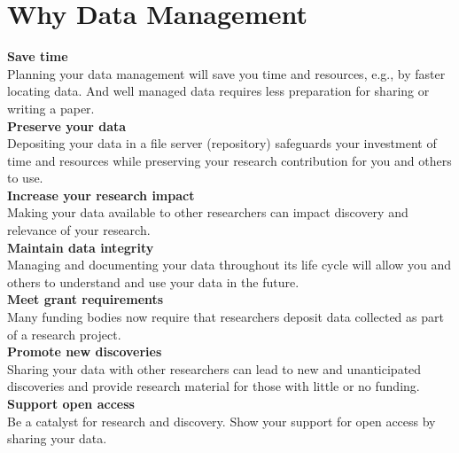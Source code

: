 \section{Why Data Management}

\textbf{Save time} \\
Planning your data management will save you time and resources, e.g., by faster locating data. And well managed data requires less preparation for sharing or writing a paper. \\[6pt]
\textbf{Preserve your data} \\
Depositing your data in a file server (repository) safeguards your investment of time and resources while preserving your research contribution for you and others to use. \\[6pt]
\textbf{Increase your research impact} \\
Making your data available to other researchers can impact discovery and relevance of your research. \\[6pt]
\textbf{Maintain data integrity} \\
Managing and documenting your data throughout its life cycle will allow you and others to understand and use your data in the future. \\[6pt]
\textbf{Meet grant requirements} \\
Many funding bodies now require that researchers deposit data collected as part of a research project. \\[6pt]
\textbf{Promote new discoveries} \\
Sharing your data with other researchers can lead to new and unanticipated discoveries and provide research material for those with little or no funding. \\[6pt]
\textbf{Support open access} \\
Be a catalyst for research and discovery. Show your support for open access by sharing your data.
